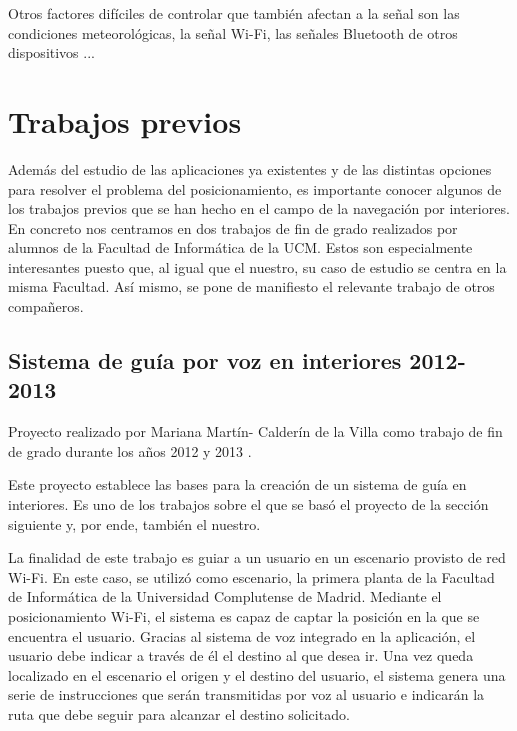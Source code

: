 Otros factores difíciles de controlar que también afectan a la señal son las condiciones meteorológicas, la señal Wi-Fi, las señales Bluetooth de otros dispositivos \citep{beaconsinterferences}...


\section{Trabajos previos}
\label{sec:trabajos_previos}

Además del estudio de las aplicaciones ya existentes y de las distintas opciones para resolver el problema del posicionamiento, es importante conocer algunos de los trabajos previos que se han hecho en el campo de la navegación por interiores. En concreto nos centramos en dos trabajos de fin de grado realizados por alumnos de la Facultad de Informática de la UCM. Estos son especialmente interesantes puesto que, al igual que el nuestro, su caso de estudio se centra en la misma Facultad. Así mismo, se pone de manifiesto el relevante trabajo de otros compañeros.


\subsection{Sistema de guía por voz en interiores 2012-2013}

Proyecto realizado por Mariana Martín- Calderín de la Villa como trabajo de fin de grado durante los años 2012 y 2013 \citep{TFGMariana}.

Este proyecto establece las bases para la creación de un sistema de guía en interiores. Es uno de los trabajos sobre el que se basó el proyecto de la sección siguiente y, por ende, también el nuestro. 

La finalidad de este trabajo es guiar a un usuario en un escenario provisto de red Wi-Fi. En este caso, se utilizó como escenario, la primera planta de la Facultad de Informática de la Universidad Complutense de Madrid. Mediante el posicionamiento Wi-Fi, el sistema es capaz de captar la posición en la que se encuentra el usuario. Gracias al sistema de voz integrado en la aplicación, el usuario debe indicar a través de él el destino al que desea ir. Una vez queda localizado en el escenario el origen y el destino del usuario, el sistema genera una serie de instrucciones que serán transmitidas por voz al usuario e indicarán la ruta que debe seguir para alcanzar el destino solicitado.

